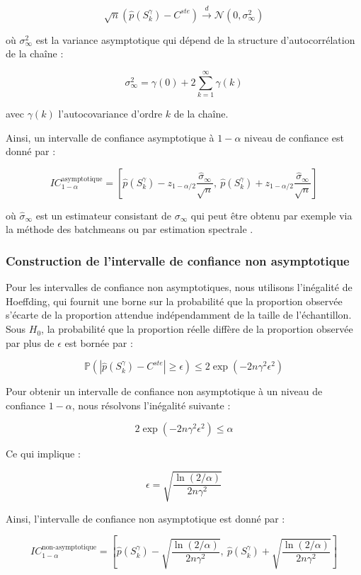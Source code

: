 \documentclass[12pt,a4paper]{article}
\theoremstyle{definition}
\theoremstyle{remark}
\begin{document}
$$
\sqrt{n}(\hat{p}(S_k^{\gamma}) - C^{ste}) \overset{d}{\to} \mathcal{N}(0, \sigma^2_{\infty})
$$

où $\sigma^2_{\infty}$ est la variance asymptotique qui dépend de la structure d'autocorrélation de la chaîne :

$$
\sigma^2_{\infty} = \gamma(0) + 2\sum_{k=1}^{\infty}\gamma(k)
$$

avec $\gamma(k)$ l'autocovariance d'ordre $k$ de la chaîne.

Ainsi, un intervalle de confiance asymptotique à $1 - \alpha$ niveau de confiance est donné par :

$$
IC_{1 - \alpha}^{\text{asymptotique}} = \left[ \hat{p}(S_k^{\gamma}) - z_{1 - \alpha/2} \frac{\hat{\sigma}_{\infty}}{\sqrt{n}}, \ \hat{p}(S_k^{\gamma}) + z_{1 - \alpha/2} \frac{\hat{\sigma}_{\infty}}{\sqrt{n}} \right]
$$

où $\hat{\sigma}_{\infty}$ est un estimateur consistant de $\sigma_{\infty}$ qui peut être obtenu par exemple via la méthode des batchmeans ou par estimation spectrale \cite{flegal2010batch}.

\subsubsection*{Construction de l'intervalle de confiance non asymptotique}

Pour les intervalles de confiance non asymptotiques, nous utilisons l'inégalité de Hoeffding, qui fournit une borne sur la probabilité que la proportion observée s'écarte de la proportion attendue indépendamment de la taille de l'échantillon. Sous $H_0$, la probabilité que la proportion réelle diffère de la proportion observée par plus de $\epsilon$ est bornée par :

$$
\mathbb{P}\left( \left| \hat{p}(S_k^{\gamma}) - C^{ste} \right| \geq \epsilon \right) \leq 2 \exp(-2 n \gamma^2 \epsilon^2)
$$

Pour obtenir un intervalle de confiance non asymptotique à un niveau de confiance $1 - \alpha$, nous résolvons l'inégalité suivante :

$$
2 \exp(-2 n \gamma^2 \epsilon^2) \leq \alpha
$$

Ce qui implique :

$$
\epsilon = \sqrt{\frac{\ln(2/\alpha)}{2 n \gamma^2}}
$$

Ainsi, l'intervalle de confiance non asymptotique est donné par :

$$
IC_{1 - \alpha}^{\text{non-asymptotique}} = \left[ \hat{p}(S_k^{\gamma}) - \sqrt{\frac{\ln(2/\alpha)}{2 n \gamma^2}}, \ \hat{p}(S_k^{\gamma}) + \sqrt{\frac{\ln(2/\alpha)}{2 n \gamma^2}} \right]
$$
\end{document}
